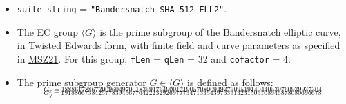 \documentclass[
]{article}
\begin{document}
\begin{itemize}
\item
  \texttt{suite\_string} = \texttt{"Bandersnatch\_SHA-512\_ELL2"}.
\item
  The EC group \(\langle G \rangle\) is the prime subgroup of the
  Bandersnatch elliptic curve, in Twisted Edwards form, with finite
  field and curve parameters as specified in
  \href{https://eprint.iacr.org/2021/1152}{MSZ21}. For this group,
  \texttt{fLen} = \texttt{qLen} = \(32\) and \texttt{cofactor} = \(4\).
\item
  The prime subgroup generator \(G \in \langle G \rangle\) is defined as
  follows:
  \[_{G_x = 18886178867200960497001835917649091219057080094937609519140440539760939937304}\]
  \[_{G_y = 19188667384257783945677642223292697773471335439753913231509108946878080696678}\]


\end{itemize}
\end{document}
